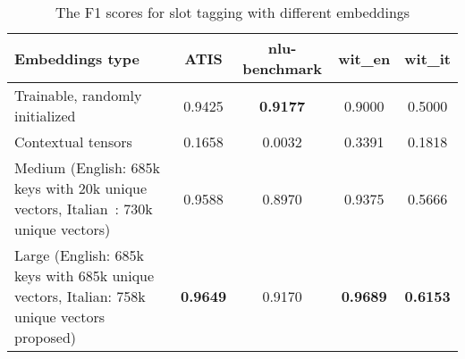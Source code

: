 
\begin{table}
  \begin{tabularx}{\textwidth}{Lcccc}
    \toprule
    \textbf{Embeddings type} & \textbf{ATIS} & \textbf{nlu-benchmark} & \textbf{wit\_en} & \textbf{wit\_it} \\
    \midrule
    Trainable, randomly initialized & 0.9425 & \textbf{0.9177} & 0.9000 & 0.5000 \\
    \midrule
    Contextual tensors & 0.1658 & 0.0032 & 0.3391 & 0.1818 \\
    \midrule
    Medium (English: 685k keys with 20k unique vectors, Italian~\cite{berardi2015word}: 730k unique vectors) & 0.9588 & 0.8970 & 0.9375 & 0.5666 \\
    \midrule
    Large (English: 685k keys with 685k unique vectors, Italian: 758k unique vectors proposed) & \textbf{0.9649} & 0.9170 & \textbf{0.9689} & \textbf{0.6153} \\
    \bottomrule
  \end{tabularx}
  \caption{The F1 scores for slot tagging with different embeddings}\label{tab:slotsEmbeddingsChoice}
\end{table}
